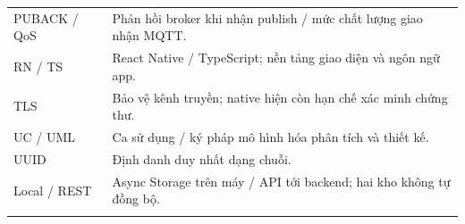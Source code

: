 {\begin{longtable}{>{\raggedright\arraybackslash}p{}>{\raggedright\arraybackslash}p{}}
PUBACK / QoS & Phản hồi broker khi nhận publish / mức chất lượng giao nhận MQTT.\\\addlinespace[1.5pt]
RN / TS & React Native / TypeScript; nền tảng giao diện và ngôn ngữ app.\\\addlinespace[1.5pt]
TLS & Bảo vệ kênh truyền; native hiện còn hạn chế xác minh chứng thư.\\\addlinespace[1.5pt]
UC / UML & Ca sử dụng / ký pháp mô hình hóa phân tích và thiết kế.\\\addlinespace[1.5pt]
UUID & Định danh duy nhất dạng chuỗi.\\\addlinespace[1.5pt]
Local / REST & Async Storage trên máy / API tới backend; hai kho không tự đồng bộ.\\\addlinespace[1.5pt]
\end{longtable}}

